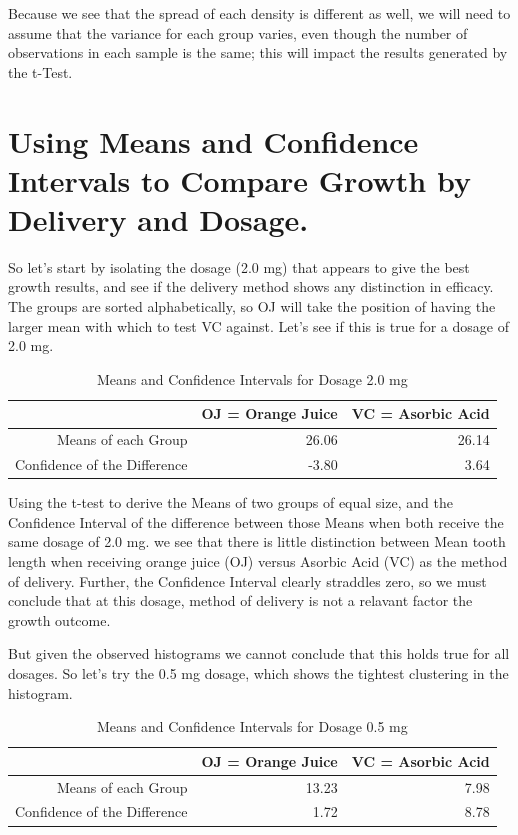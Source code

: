 \documentclass[]{article}
\begin{document}
Because we see that the spread of each density is different as well, we
will need to assume that the variance for each group varies, even though
the number of observations in each sample is the same; this will impact
the results generated by the t-Test.

\section{Using Means and Confidence Intervals to Compare Growth by
Delivery and
Dosage.}\label{using-means-and-confidence-intervals-to-compare-growth-by-delivery-and-dosage.}

So let's start by isolating the dosage (2.0 mg) that appears to give the
best growth results, and see if the delivery method shows any
distinction in efficacy. The groups are sorted alphabetically, so OJ
will take the position of having the larger mean with which to test VC
against. Let's see if this is true for a dosage of 2.0 mg.

\begin{table}[ht]
\centering
\begin{tabular}{rrr}
  \hline
 & OJ = Orange Juice & VC = Asorbic Acid \\ 
  \hline
Means of each Group & 26.06 & 26.14 \\ 
  Confidence of the Difference & -3.80 & 3.64 \\ 
   \hline
\end{tabular}
\caption{Means and Confidence Intervals for Dosage 2.0 mg} 
\end{table}

Using the t-test to derive the Means of two groups of equal size, and
the Confidence Interval of the difference between those Means when both
receive the same dosage of 2.0 mg. we see that there is little
distinction between Mean tooth length when receiving orange juice (OJ)
versus Asorbic Acid (VC) as the method of delivery. Further, the
Confidence Interval clearly straddles zero, so we must conclude that at
this dosage, method of delivery is not a relavant factor the growth
outcome.

But given the observed histograms we cannot conclude that this holds
true for all dosages. So let's try the 0.5 mg dosage, which shows the
tightest clustering in the histogram.

\begin{table}[ht]
\centering
\begin{tabular}{rrr}
  \hline
 & OJ = Orange Juice & VC = Asorbic Acid \\ 
  \hline
Means of each Group & 13.23 & 7.98 \\ 
  Confidence of the Difference & 1.72 & 8.78 \\ 
   \hline
\end{tabular}
\caption{Means and Confidence Intervals for Dosage 0.5 mg} 
\end{table}
\end{document}
